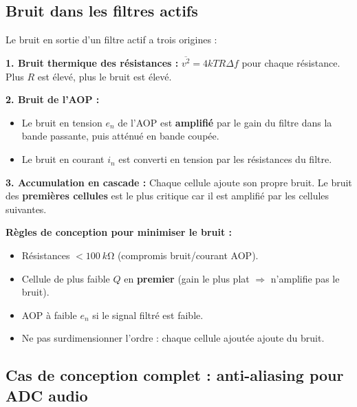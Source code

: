 \documentclass[12pt,a4paper,twoside]{book}
\begin{document}
\subsection{Bruit dans les filtres actifs}

\begin{formule}
Le bruit en sortie d'un filtre actif a trois origines :

\textbf{1. Bruit thermique des résistances :}
$\overline{v^2} = 4kTR\Delta f$ pour chaque résistance. Plus $R$ est élevé, plus le bruit est élevé.

\textbf{2. Bruit de l'AOP :}
\begin{itemize}[nosep]
\item Le bruit en tension $e_n$ de l'AOP est \textbf{amplifié} par le gain du filtre dans la bande passante, puis atténué en bande coupée.
\item Le bruit en courant $i_n$ est converti en tension par les résistances du filtre.
\end{itemize}

\textbf{3. Accumulation en cascade :}
Chaque cellule ajoute son propre bruit. Le bruit des \textbf{premières cellules} est le plus critique car il est amplifié par les cellules suivantes.

\textbf{Règles de conception pour minimiser le bruit :}
\begin{itemize}[nosep]
\item Résistances $< \SI{100}{k\ohm}$ (compromis bruit/courant AOP).
\item Cellule de plus faible $Q$ en \textbf{premier} (gain le plus plat $\Rightarrow$ n'amplifie pas le bruit).
\item AOP à faible $e_n$ si le signal filtré est faible.
\item Ne pas surdimensionner l'ordre : chaque cellule ajoutée ajoute du bruit.
\end{itemize}
\end{formule}

\subsection{Cas de conception complet : anti-aliasing pour ADC audio}
\end{document}

